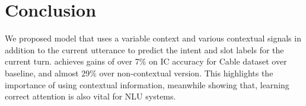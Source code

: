\section{Conclusion}
\label{sec:conclusion}
We proposed 
model that uses a variable context and various contextual signals in addition to the current utterance to predict the intent and slot labels for the current turn.  achieves gains of over 7\% on IC accuracy for {Cable} dataset over  baseline, and almost 29\% over non-contextual version. This highlights the importance of using contextual information, meanwhile showing that, learning correct attention is also vital for NLU systems.    
